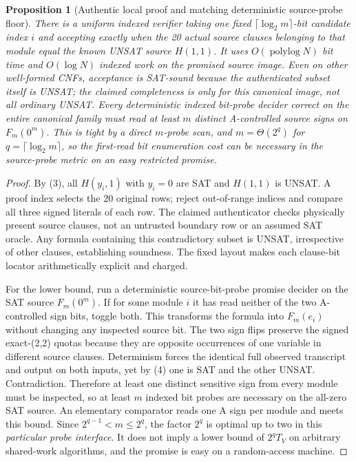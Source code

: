 \documentclass[11pt]{article}
\newtheorem{proposition}[theorem]{Proposition}
\begin{document}
\begin{proposition}[Authentic local proof and matching deterministic source-probe floor]\label{pr:w1}
There is a uniform indexed verifier taking one fixed $\lceil\log_2m\rceil$-bit candidate index $i$ and accepting exactly when the \emph{20 actual source clauses} belonging to that module equal the known UNSAT source $H(1,1)$. It uses $O(\operatorname{polylog}N)$ bit time and $O(\log N)$ indexed work on the promised source image. Even on other \emph{well-formed} CNFs, acceptance is SAT-sound because the authenticated subset itself is UNSAT; the claimed completeness is only for this canonical image, not all ordinary UNSAT. Every deterministic indexed bit-probe decider correct on the entire canonical family must read at least $m$ distinct A-controlled source signs on $F_m(0^m)$. This is tight by a direct $m$-probe scan, and $m=\Theta(2^q)$ for $q=\lceil\log_2m\rceil$, so the first-read bit enumeration cost can be necessary in the \emph{source-probe} metric on an easy restricted promise.
\end{proposition}
\begin{proof}
By (3), all $H(y_i,1)$ with $y_i=0$ are SAT and $H(1,1)$ is UNSAT. A proof index selects the 20 original rows; reject out-of-range indices and compare all three signed literals of each row. The claimed authenticator checks physically present source clauses, not an untrusted boundary row or an assumed SAT oracle. Any formula containing this contradictory subset is UNSAT, irrespective of other clauses, establishing soundness. The fixed layout makes each clause-bit locator arithmetically explicit and charged.

For the lower bound, run a deterministic source-bit-probe promise decider on the SAT source $F_m(0^m)$. If for some module $i$ it has read neither of the two A-controlled sign bits, toggle both. This transforms the formula into $F_m(e_i)$ without changing any inspected source bit. The two sign flips preserve the signed exact-(2,2) quotas because they are opposite occurrences of one variable in different source clauses. Determinism forces the identical full observed transcript and output on both inputs, yet by (4) one is SAT and the other UNSAT. Contradiction. Therefore at least one distinct sensitive sign from every module must be inspected, so at least $m$ indexed bit probes are necessary on the all-zero SAT source. An elementary comparator reads one A sign per module and meets this bound. Since $2^{q-1}<m\le2^q$, the factor $2^q$ is optimal up to two in this \emph{particular probe interface}. It does not imply a lower bound of $2^qT_V$ on arbitrary shared-work algorithms, and the promise is easy on a random-access machine.
\end{proof}
\end{document}
